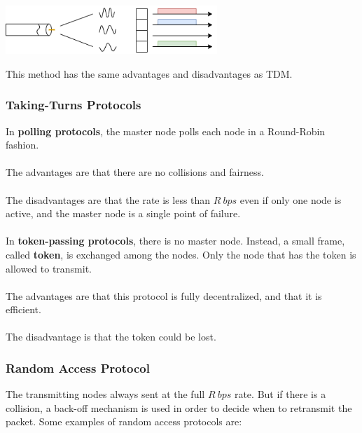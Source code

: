 \documentclass{article}
\begin{document}
\centerline{\includegraphics[width=8cm]{./assets/fdm.png}}
\vspace{.9cm}
This method has the same advantages and disadvantages as TDM.

\subsubsection{Taking-Turns Protocols}
In \textbf{polling protocols}, the master node polls each node in a Round-Robin fashion. \\ \\
The advantages are that there are no collisions and fairness. \\ \\
The disadvantages are that the rate is less than $R~bps$ even if only one node is active, and the master node is a single point of failure. \\ \\
In \textbf{token-passing protocols}, there is no master node. Instead, a small frame, called \textbf{token}, is exchanged among the nodes. Only the node that has the token is allowed to transmit. \\ \\
The advantages are that this protocol is fully decentralized, and that it is efficient. \\ \\
The disadvantage is that the token could be lost.

\subsubsection{Random Access Protocol}
The transmitting nodes always sent at the full $R~bps$ rate. But if there is a collision, a back-off mechanism is used in order to decide when to retransmit the packet. Some examples of random access protocols are:
\end{document}
